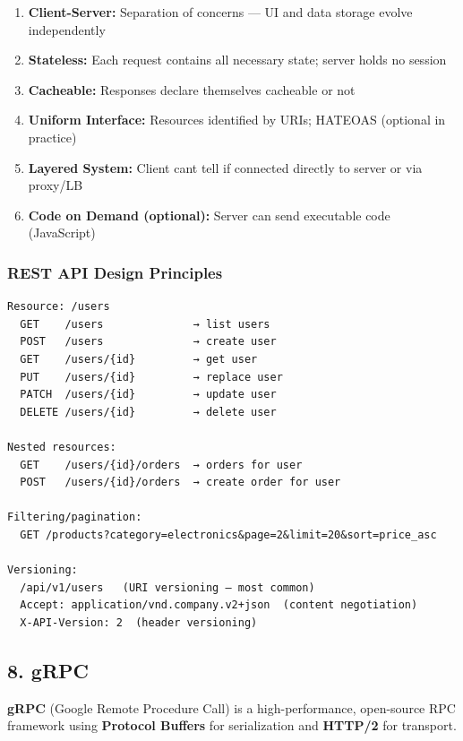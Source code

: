 \documentclass[11pt]{article}
\providecommand{\tightlist}{\setlength{\itemsep}{1pt}\setlength{\parskip}{0pt}}
\begin{document}
\begin{enumerate}
\def\labelenumi{\arabic{enumi}.}
\tightlist
\item
  \textbf{Client-Server:} Separation of concerns --- UI and data storage evolve independently
\item
  \textbf{Stateless:} Each request contains all necessary state; server holds no session
\item
  \textbf{Cacheable:} Responses declare themselves cacheable or not
\item
  \textbf{Uniform Interface:} Resources identified by URIs; HATEOAS (optional in practice)
\item
  \textbf{Layered System:} Client can\textquotesingle t tell if connected directly to server or via proxy/LB
\item
  \textbf{Code on Demand (optional):} Server can send executable code (JavaScript)
\end{enumerate}

\subsubsection{REST API Design Principles}\label{rest-api-design-principles}

\setcodelang{}

\begin{verbatim}
Resource: /users
  GET    /users              → list users
  POST   /users              → create user
  GET    /users/{id}         → get user
  PUT    /users/{id}         → replace user
  PATCH  /users/{id}         → update user
  DELETE /users/{id}         → delete user

Nested resources:
  GET    /users/{id}/orders  → orders for user
  POST   /users/{id}/orders  → create order for user

Filtering/pagination:
  GET /products?category=electronics&page=2&limit=20&sort=price_asc

Versioning:
  /api/v1/users   (URI versioning — most common)
  Accept: application/vnd.company.v2+json  (content negotiation)
  X-API-Version: 2  (header versioning)
\end{verbatim}

\subsection{8. gRPC}\label{8-grpc}

\textbf{gRPC} (Google Remote Procedure Call) is a high-performance, open-source RPC framework using \textbf{Protocol Buffers} for serialization and \textbf{HTTP/2} for transport.
\end{document}

